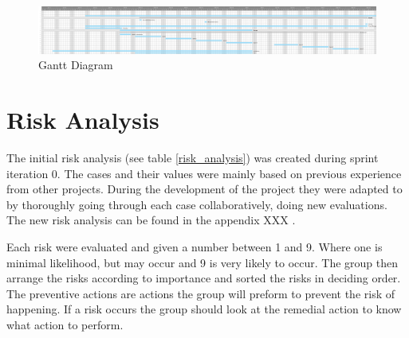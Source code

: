 \begin{figure}[h!]
\centering
    \includegraphics[width=1.0\textwidth]{fig/gantt}
\caption{Gantt Diagram}
\end{figure}

\section{Risk Analysis} 
\label{riskAnalysis}
The initial risk analysis (see table \ref{risk_analysis}) was created during sprint iteration 0. The cases and their values were mainly based on previous experience from other projects. During the development of the project they were adapted to by thoroughly going through each case collaboratively, doing new evaluations. The new risk analysis can be found in the appendix XXX .

Each risk were evaluated and given a number between 1 and 9. Where one is minimal likelihood, but may occur and 9 is very likely to occur. The group then arrange the risks according to importance and sorted the risks in deciding order. The preventive actions are actions the group will preform to prevent the risk of happening. If a risk occurs the group should look at the remedial action to know what action to perform. 


